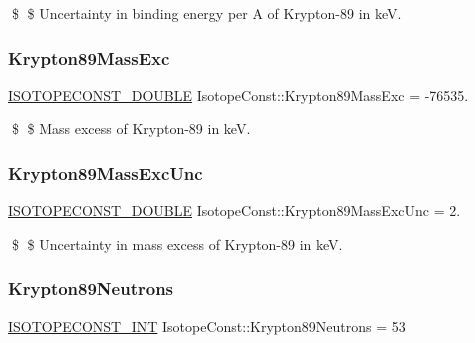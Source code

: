 \$ \$ Uncertainty in binding energy per A of Krypton-\/89 in keV. \mbox{\label{group___isotope_const-_krypton-_kr89_gab046babc62d8595e7c61c50d4656b72e}} 
\subsubsection{\texorpdfstring{Krypton89\+Mass\+Exc}{Krypton89MassExc}}
{\footnotesize\ttfamily \mbox{\hyperlink{group___isotope_const-_macros_ga8f45a7272ce02c0b4c65c44636ed719a}{I\+S\+O\+T\+O\+P\+E\+C\+O\+N\+S\+T\+\_\+\+D\+O\+U\+B\+LE}} Isotope\+Const\+::\+Krypton89\+Mass\+Exc = -\/76535.}

\$ \$ Mass excess of Krypton-\/89 in keV. \mbox{\label{group___isotope_const-_krypton-_kr89_ga15a2776ac7f43adc00bb6a8797f9783c}} 
\subsubsection{\texorpdfstring{Krypton89\+Mass\+Exc\+Unc}{Krypton89MassExcUnc}}
{\footnotesize\ttfamily \mbox{\hyperlink{group___isotope_const-_macros_ga8f45a7272ce02c0b4c65c44636ed719a}{I\+S\+O\+T\+O\+P\+E\+C\+O\+N\+S\+T\+\_\+\+D\+O\+U\+B\+LE}} Isotope\+Const\+::\+Krypton89\+Mass\+Exc\+Unc = 2.}

\$ \$ Uncertainty in mass excess of Krypton-\/89 in keV. \mbox{\label{group___isotope_const-_krypton-_kr89_gaea777b9fd13bb0e86fea14b7248c7922}} 
\subsubsection{\texorpdfstring{Krypton89\+Neutrons}{Krypton89Neutrons}}
{\footnotesize\ttfamily \mbox{\hyperlink{group___isotope_const-_macros_ga5f18360b3e99483a35c32d789e62621c}{I\+S\+O\+T\+O\+P\+E\+C\+O\+N\+S\+T\+\_\+\+I\+NT}} Isotope\+Const\+::\+Krypton89\+Neutrons = 53}

